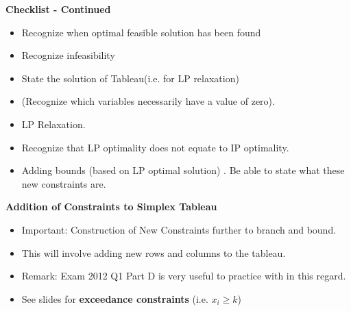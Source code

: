 \documentclass{beamer}
\begin{document}
\begin{frame}
\vspace{-0.5cm}
	\noindent \textbf{Checklist - Continued}
	
	\begin{itemize}
				\item Recognize when optimal feasible solution has been found
				\item Recognize infeasibility 
		\item State the solution of Tableau(i.e. for LP relaxation)
		\item (Recognize which variables necessarily have a value of zero).
		\item LP Relaxation.
		\item Recognize that LP optimality does not equate to IP optimality.
		\item Adding bounds (based on LP optimal solution) . Be able to state what these new constraints are.
	\end{itemize}
\end{frame}
\begin{frame}
	\noindent \textbf{Addition of Constraints to Simplex Tableau}
	
	\begin{itemize}
\item Important: Construction of New Constraints further to branch and bound.
\item This will involve adding new rows and columns to the tableau.
\item Remark: Exam 2012 Q1 Part D is very useful to practice with in this regard.
\item See slides for \textbf{exceedance constraints} (i.e. $x_i \geq  k$)
\end{itemize}
\end{frame}
\end{document}

